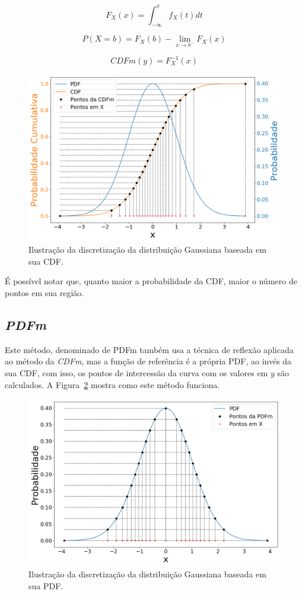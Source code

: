 \begin{equation}
\displaystyle F_X(x) = \int_{-\infty}^{x} f_X(t)dt
\label{equ:CDF}
\end{equation}

\begin{equation}
 {P} (X=b)=F_{X}(b)-\lim _{x\to b^{-}}F_{X}(x)
 \label{equ:CDF_disc}
\end{equation}

\begin{equation}
CDFm(y) = F^{-1}_X(x)
\label{equ:cdf_inv}
\end{equation}

\begin{figure}[H]
	\centering
	\includegraphics[width=0.6\linewidth]{./figuras/CDFm_normal_1}
	\caption{Ilustração da discretização da distribuição Gaussiana baseada em sua CDF.}
	\label{fig:CDFm_curve}
\end{figure}

É possível notar que, quanto maior a probabilidade da \ac{CDF}, maior o número de pontos em sua região.

\subsection{\textit{PDFm}}
Este método, denominado de \ac{PDFm} também usa a técnica de reflexão aplicada ao método da \textit{CDFm}, mas a função de referência é a própria \ac{PDF}, ao invés da sua \ac{CDF}, com isso, os pontos de intercessão da curva com os valores em $ y $ são calculados. A Figura~\ref{fig:PDFm_curve} mostra como este método funciona. 

\begin{figure}[H]
	\centering
	\includegraphics[width=0.67\linewidth]{./figuras/PDFm_normal_1}
	\caption{Ilustração da discretização da distribuição Gaussiana baseada em sua PDF.}
	\label{fig:PDFm_curve}
\end{figure}

